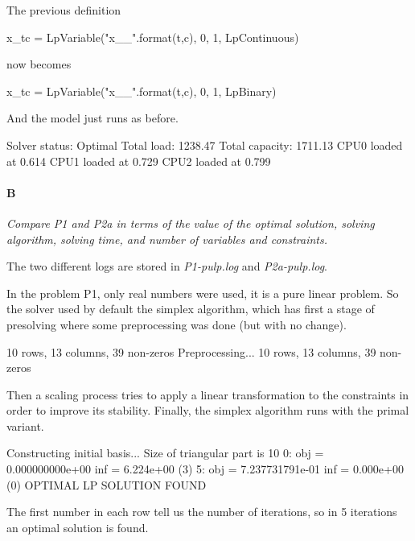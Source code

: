 \documentclass[11pt,a4paper]{article}
\begin{document}
The previous definition
\begin{pycode}
x_tc = LpVariable("x_{}_{}".format(t,c),
	0, 1, LpContinuous)
\end{pycode}
now becomes
\begin{pycode}
x_tc = LpVariable("x_{}_{}".format(t,c),
	0, 1, LpBinary)
\end{pycode}
And the model just runs as before.
\begin{textcode}
Solver status: Optimal
Total load: 1238.47
Total capacity: 1711.13
CPU0 loaded at 0.614
CPU1 loaded at 0.729
CPU2 loaded at 0.799
\end{textcode}
%
\paragraph*{B}
{\sl Compare P1 and P2a in terms of the value of the optimal solution, solving 
algorithm, solving time, and number of variables and constraints.}

The two different logs are stored in {\sl P1-pulp.log} and {\sl P2a-pulp.log}.

In the problem P1, only real numbers were used, it is a pure linear problem.  So 
the solver used by default the simplex algorithm, which has first a stage of 
presolving where some preprocessing was done (but with no change).
%
\begin{textcode}
10 rows, 13 columns, 39 non-zeros
Preprocessing...
10 rows, 13 columns, 39 non-zeros
\end{textcode}
%
Then a scaling process tries to apply a linear transformation to the constraints 
in order to improve its stability. Finally, the simplex algorithm runs with the 
primal variant.
%
\begin{textcode}
Constructing initial basis...
Size of triangular part is 10
      0: obj =   0.000000000e+00 inf =   6.224e+00 (3)
      5: obj =   7.237731791e-01 inf =   0.000e+00 (0)
OPTIMAL LP SOLUTION FOUND
\end{textcode}
%
The first number in each row tell us the number of iterations, so in 5 
iterations an optimal solution is found.
\end{document}
